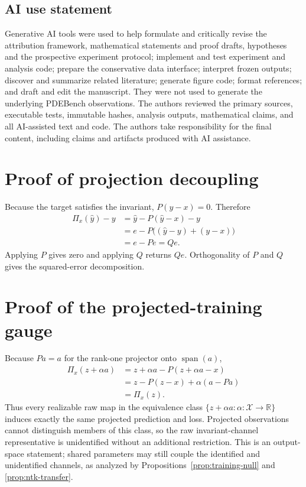 \documentclass{article}
\begin{document}
\subsection*{AI use statement}

Generative AI tools were used to help formulate and critically revise the attribution framework,
mathematical statements and proof drafts, hypotheses and the prospective experiment protocol;
implement and test experiment and analysis code; prepare the conservative data interface; interpret
frozen outputs; discover and summarize related literature; generate figure code; format references;
and draft and edit the manuscript. They were not used to generate the underlying PDEBench
observations. The authors
reviewed the primary sources, executable tests, immutable hashes, analysis outputs, mathematical
claims, and all AI-assisted text and code. The authors take responsibility for the final content,
including claims and artifacts produced with AI assistance.




\appendix

\section{Proof of projection decoupling}
\label{app:proof}

Because the target satisfies the invariant, $P(y-x)=0$. Therefore
\begin{align}
  \Pi_x(\hat y)-y
  &=\hat y-P(\hat y-x)-y \\
  &=e-P\bigl((\hat y-y)+(y-x)\bigr) \\
  &=e-Pe=Qe.
\end{align}
Applying $P$ gives zero and applying $Q$ returns $Qe$. Orthogonality of $P$ and $Q$ gives the
squared-error decomposition.

\section{Proof of the projected-training gauge}
\label{app:gauge}

Because $Pa=a$ for the rank-one projector onto $\operatorname{span}(a)$,
\begin{align}
  \Pi_x(z+\alpha a)
  &=z+\alpha a-P(z+\alpha a-x) \\
  &=z-P(z-x)+\alpha(a-Pa) \\
  &=\Pi_x(z).
\end{align}
Thus every realizable raw map in the equivalence class
$\{z+\alpha a:\alpha\colon\mathcal X\rightarrow\mathbb R\}$ induces exactly the same projected
prediction and loss. Projected observations cannot distinguish members of this class, so the raw
invariant-channel representative is unidentified without an additional restriction. This is an
output-space statement; shared parameters may still couple the identified and unidentified
channels, as analyzed by Propositions~\ref{prop:training-null} and \ref{prop:ntk-transfer}.
\end{document}

